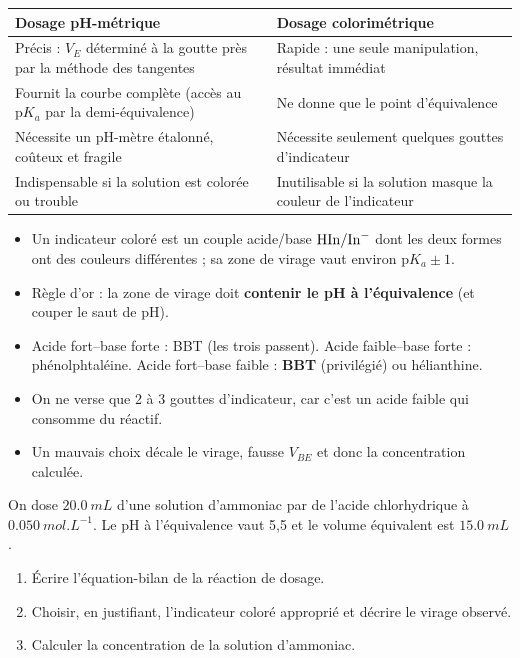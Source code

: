 \documentclass[11pt]{article}
\begin{document}
\begin{center}
\begin{tabularx}{\linewidth}{|X|X|}
\hline
\rowcolor{popblueL} \textbf{Dosage pH-métrique} & \textbf{Dosage colorimétrique} \\
\hline
Précis : $V_E$ déterminé à la goutte près par la méthode des tangentes & Rapide : une seule manipulation, résultat immédiat \\
\hline
Fournit la courbe complète (accès au $\mathrm{p}K_a$ par la demi-équivalence) & Ne donne que le point d'équivalence \\
\hline
Nécessite un pH-mètre étalonné, coûteux et fragile & Nécessite seulement quelques gouttes d'indicateur \\
\hline
Indispensable si la solution est colorée ou trouble & Inutilisable si la solution masque la couleur de l'indicateur \\
\hline
\end{tabularx}
\end{center}

\begin{aretenir}
\begin{itemize}
\item Un indicateur coloré est un couple acide/base $\ce{HIn}/\ce{In-}$ dont les deux formes ont des couleurs différentes ; sa zone de virage vaut environ $\mathrm{p}K_a \pm 1$.
\item Règle d'or : la zone de virage doit \textbf{contenir le pH à l'équivalence} (et couper le saut de pH).
\item Acide fort--base forte : BBT (les trois passent). Acide faible--base forte : phénolphtaléine. Acide fort--base faible : \textbf{BBT} (privilégié) ou hélianthine.
\item On ne verse que 2 à 3 gouttes d'indicateur, car c'est un acide faible qui consomme du réactif.
\item Un mauvais choix décale le virage, fausse $V_{BE}$ et donc la concentration calculée.
\end{itemize}
\end{aretenir}

\begin{exercice}
On dose $\SI{20,0}{mL}$ d'une solution d'ammoniac par de l'acide chlorhydrique à $\SI{0,050}{mol.L^{-1}}$. Le pH à l'équivalence vaut 5,5 et le volume équivalent est $\SI{15,0}{mL}$.
\begin{enumerate}
\item Écrire l'équation-bilan de la réaction de dosage.
\item Choisir, en justifiant, l'indicateur coloré approprié et décrire le virage observé.
\item Calculer la concentration de la solution d'ammoniac.
\end{enumerate}
\end{exercice}
\end{document}
